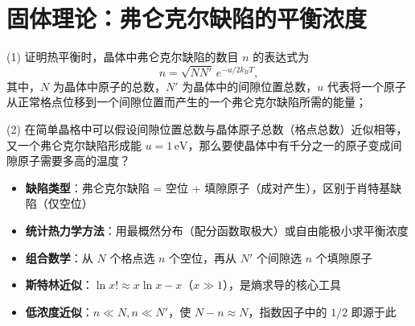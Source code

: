 \section{固体理论：弗仑克尔缺陷的平衡浓度}
\label{sec:frenkel-defect}

\begin{modelbox}[题目：弗仑克尔缺陷数目与温度]
(1) 证明热平衡时，晶体中弗仑克尔缺陷的数目 $n$ 的表达式为
\begin{equation}
n = \sqrt{NN'}\, e^{-u/2k_{\!B}T},
\end{equation}
其中，$N$ 为晶体中原子的总数，$N'$ 为晶体中的间隙位置总数，$u$ 代表将一个原子从正常格点位移到一个间隙位置而产生的一个弗仑克尔缺陷所需的能量；

(2) 在简单晶格中可以假设间隙位置总数与晶体原子总数（格点总数）近似相等，又一个弗仑克尔缺陷形成能 $u=1\,\mathrm{eV}$，那么要使晶体中有千分之一的原子变成间隙原子需要多高的温度？
\end{modelbox}

\begin{tipbox}[考点快速分析]
\begin{itemize}
    \item \textbf{缺陷类型}：弗仑克尔缺陷 = 空位 + 填隙原子（成对产生），区别于肖特基缺陷（仅空位）
    \item \textbf{统计热力学方法}：用最概然分布（配分函数取极大）或自由能极小求平衡浓度
    \item \textbf{组合数学}：从 $N$ 个格点选 $n$ 个空位，再从 $N'$ 个间隙选 $n$ 个填隙原子
    \item \textbf{斯特林近似}：$\ln x! \approx x\ln x - x$（$x\gg 1$），是熵求导的核心工具
    \item \textbf{低浓度近似}：$n\ll N, n\ll N'$，使 $N-n\approx N$，指数因子中的 $1/2$ 即源于此
\end{itemize}
\end{tipbox}

